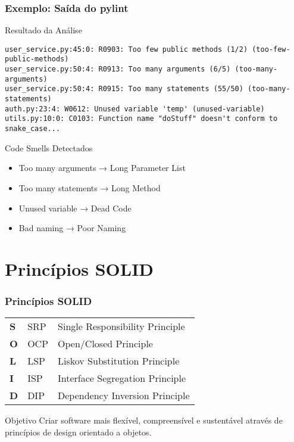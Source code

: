 \documentclass[aspectratio=169]{beamer}
\begin{document}
\begin{frame}[fragile]
\frametitle{Exemplo: Saída do pylint}
\begin{block}{Resultado da Análise}
\scriptsize
\begin{verbatim}
user_service.py:45:0: R0903: Too few public methods (1/2) (too-few-public-methods)
user_service.py:50:4: R0913: Too many arguments (6/5) (too-many-arguments)
user_service.py:50:4: R0915: Too many statements (55/50) (too-many-statements)
auth.py:23:4: W0612: Unused variable 'temp' (unused-variable)
utils.py:10:0: C0103: Function name "doStuff" doesn't conform to snake_case...
\end{verbatim}
\end{block}

\begin{block}{Code Smells Detectados}
\footnotesize
\begin{itemize}
    \item \textcolor{cleanred}{Too many arguments} → Long Parameter List
    \item \textcolor{cleanred}{Too many statements} → Long Method
    \item \textcolor{cleanred}{Unused variable} → Dead Code
    \item \textcolor{cleanred}{Bad naming} → Poor Naming
\end{itemize}
\end{block}
\end{frame}

\section{Princípios SOLID}

\begin{frame}
\frametitle{Princípios SOLID}
\begin{center}
\begin{tabular}{lll}
\textbf{S} & SRP & Single Responsibility Principle \\
\textbf{O} & OCP & Open/Closed Principle \\
\textbf{L} & LSP & Liskov Substitution Principle \\
\textbf{I} & ISP & Interface Segregation Principle \\
\textbf{D} & DIP & Dependency Inversion Principle \\
\end{tabular}
\end{center}

\vspace{0.5cm}
\begin{block}{Objetivo}
\footnotesize
Criar software mais flexível, compreensível e sustentável através de princípios de design orientado a objetos.
\end{block}
\end{frame}
\end{document}
